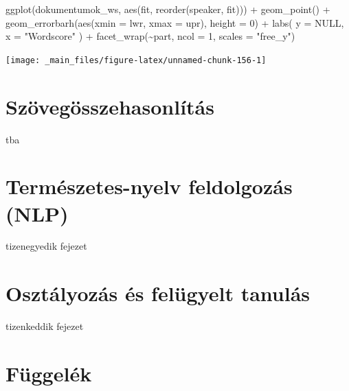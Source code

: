 \documentclass[
]{book}
\newenvironment{Shaded}{\begin{snugshade}}{\end{snugshade}}
\newcommand{\AttributeTok}[1]{\textcolor[rgb]{0.77,0.63,0.00}{#1}}
\newcommand{\ConstantTok}[1]{\textcolor[rgb]{0.00,0.00,0.00}{#1}}
\newcommand{\DecValTok}[1]{\textcolor[rgb]{0.00,0.00,0.81}{#1}}
\newcommand{\FunctionTok}[1]{\textcolor[rgb]{0.00,0.00,0.00}{#1}}
\newcommand{\NormalTok}[1]{#1}
\newcommand{\SpecialCharTok}[1]{\textcolor[rgb]{0.00,0.00,0.00}{#1}}
\newcommand{\StringTok}[1]{\textcolor[rgb]{0.31,0.60,0.02}{#1}}
\begin{document}
\begin{Shaded}
\begin{Highlighting}[]

\FunctionTok{ggplot}\NormalTok{(dokumentumok\_ws, }\FunctionTok{aes}\NormalTok{(fit, }\FunctionTok{reorder}\NormalTok{(speaker, fit))) }\SpecialCharTok{+}
  \FunctionTok{geom\_point}\NormalTok{() }\SpecialCharTok{+}
  \FunctionTok{geom\_errorbarh}\NormalTok{(}\FunctionTok{aes}\NormalTok{(}\AttributeTok{xmin =}\NormalTok{ lwr, }\AttributeTok{xmax =}\NormalTok{ upr), }\AttributeTok{height =} \DecValTok{0}\NormalTok{) }\SpecialCharTok{+}
  \FunctionTok{labs}\NormalTok{(}
    \AttributeTok{y =} \ConstantTok{NULL}\NormalTok{,}
    \AttributeTok{x =} \StringTok{"Wordscore"}
\NormalTok{  ) }\SpecialCharTok{+}
  \FunctionTok{facet\_wrap}\NormalTok{(}\SpecialCharTok{\textasciitilde{}}\NormalTok{part, }\AttributeTok{ncol =} \DecValTok{1}\NormalTok{, }\AttributeTok{scales =} \StringTok{"free\_y"}\NormalTok{)}
\end{Highlighting}
\end{Shaded}

\begin{center}\texttt{[image: \_main\_files/figure-latex/unnamed-chunk-156-1]} \end{center}

\hypertarget{szuxf6veguxf6sszehasonluxedtuxe1s}{%
\chapter{Szövegösszehasonlítás}\label{szuxf6veguxf6sszehasonluxedtuxe1s}}

tba

\hypertarget{termuxe9szetes-nyelv-feldolgozuxe1s-nlp}{%
\chapter{Természetes-nyelv feldolgozás
(NLP)}\label{termuxe9szetes-nyelv-feldolgozuxe1s-nlp}}

tizenegyedik fejezet

\hypertarget{osztuxe1lyozuxe1s-uxe9s-feluxfcgyelt-tanuluxe1s}{%
\chapter{Osztályozás és felügyelt
tanulás}\label{osztuxe1lyozuxe1s-uxe9s-feluxfcgyelt-tanuluxe1s}}

tizenkeddik fejezet

\hypertarget{fuxfcggeluxe9k}{%
\chapter{Függelék}\label{fuxfcggeluxe9k}}
\end{document}
